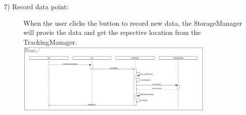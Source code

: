 \begin{description}
	\item[7) Record data point: ] When the user clicks the button to record new data, the StorageManager will provie the data and get the repective location from the TrackingManager.\\
	\includegraphics[width=0.8\textwidth]{diagramms/recordDatapoint.png}



\end{description}
